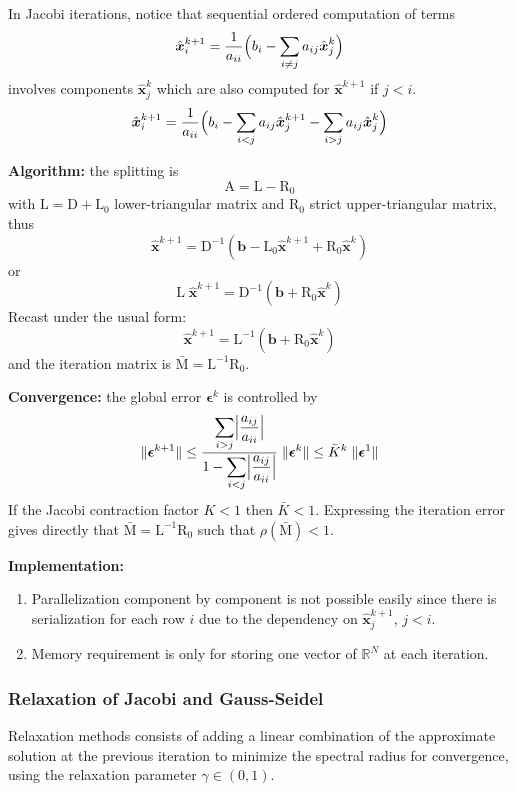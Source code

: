 \documentclass{article}
\newcommand{\xR}{\mathbb{R}}
\newcommand{\xRN}{{\xR^N}}
\newcommand{\bb}{{\boldsymbol b}}
\newcommand{\ev}{{\boldsymbol \epsilon}}
\newcommand{\hx}{\hat{\boldsymbol x}}
\newcommand{\mA}{{\mathrm A}}
\newcommand{\mD}{{\mathrm D}}
\newcommand{\mL}{{\mathrm L}}
\newcommand{\mLs}{{\mathrm L_0}}
\newcommand{\mM}{{\mathrm M}}
\newcommand{\mRs}{{\mathrm R_0}}
\newcommand{\norm}[1]{{\lVert #1 \rVert}}
\begin{document}
In Jacobi iterations, notice that sequential ordered computation of terms
\begin{equation}
\hx^{k+1}_i = \frac{1}{a_{ii}}\Bigl( b_i - \sum_{i\neq j} a_{ij} \hx^{k}_j \Bigr)
\end{equation}
involves components $\hx^{k}_j$ which are also computed for $\hx^{k+1}$ if $j < i$.
\begin{equation}
\hx^{k+1}_i = \frac{1}{a_{ii}}\Bigl( b_i - \sum_{i < j} a_{ij} \hx^{k+1}_j - \sum_{i > j} a_{ij} \hx^{k}_j \Bigr)
\end{equation}

\medskip
\textbf{Algorithm:} the splitting is
\[
\mA = \mL - \mRs
\]
with $\mL = \mD + \mLs$ lower-triangular matrix and $\mRs$ strict upper-triangular matrix, thus
\[
\hx^{k+1} = \mD^{-1}(\bb - \mLs \hx^{k+1} + \mRs \hx^{k})
\]
or
\[
\mL\;\hx^{k+1} = \mD^{-1}(\bb + \mRs \hx^{k})
\]
Recast under the usual form:
\[
\hx^{k+1} = \mL^{-1}(\bb + \mRs \hx^{k})
\]
and the iteration matrix is $\bar \mM = \mL^{-1}\mRs$.

\medskip
\textbf{Convergence:} the global error $\ev^k$ is controlled by
\begin{equation*}
\norm{\ev^{k+1}} \leq \frac{\displaystyle\sum_{i > j} \Bigl\lvert\frac{a_{ij}}{a_{ii}}\Bigr\rvert}{1 - \displaystyle\sum_{i < j} \Bigl\lvert\frac{a_{ij}}{a_{ii}}\Bigr\rvert}\;\norm{\ev^{k}} \leq \bar{K}^k \; \norm{\ev^{1}}
\end{equation*}
If the Jacobi contraction factor $K < 1$ then $\bar{K} < 1$.
Expressing the iteration error gives directly that $\bar\mM = \mL^{-1}\mRs$ such that $\rho(\bar\mM)< 1$.


\medskip
\textbf{Implementation:}
\begin{enumerate}
\item Parallelization component by component is not possible easily since there is serialization for each row $i$ due to the dependency on $\hx_j^{k+1}$, $j < i$.
\item Memory requirement is only for storing one vector of $\xRN$ at each iteration.
\end{enumerate}


\subsubsection{Relaxation of Jacobi and Gauss-Seidel}

Relaxation methods consists of adding a linear combination of the approximate solution at the previous iteration to minimize the spectral radius for convergence, using the relaxation parameter $\gamma \in (0,1)$. 
\end{document}
